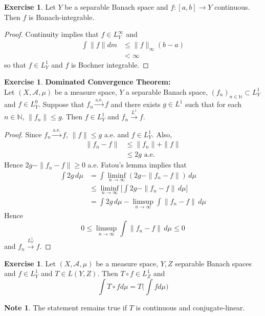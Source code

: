 \documentclass{book}
\theoremstyle{definition}
\newtheorem{note}[definition]{Note}
\newtheorem{ex}[definition]{Exercise}
\newcommand{\N}{\mathbb{N}}
\newcommand{\MA}{\mathcal{A}}
\newcommand{\lex}[1]{\label{ex:#1}}
\DeclareMathOperator*{\0}{\mbf{0}}
\DeclareMathOperator*{\1}{\mbf{1}}
\newcommand{\limfn}{\liminf \limits_{n \rightarrow \infty}}
\newcommand{\limpn}{\limsup \limits_{n \rightarrow \infty}}
\newcommand{\convt}[1]{\xrightarrow{\text{#1}}}
\newcommand{\conv}[1]{\xrightarrow{#1}}
\newcommand{\dmu}{\, d \mu}
\begin{document}
	
	\begin{ex} \lex{00000} 
	Let $Y$ be a separable Banach space and $f:[a,b] \rightarrow Y$ continuous. Then $f$ is Banach-integrable.
	\end{ex}
	
	\begin{proof}
	Continuity implies that $f \in L_Y^{\infty}$ and 
	\begin{align*}
	\int \| f \| dm 
	&\leq \| f\|_{\infty}(b-a) \\
	&< \infty
\end{align*}
	so that $f \in L^1_Y$ and $f$ is Bochner integrable.
\end{proof}			
	
	\begin{ex} \lex{00000} \textbf{Dominated Convergence Theorem:}\\  
		Let $(X, \MA, \mu)$ be a measure space, $Y$ a separable Banach space, $(f_n)_{n \in \N} \subset L^1_Y$ and $f \in L^0_Y$. Suppose that $f_n \convt{a.e.} f$ and there exists $g \in L^1$ such that for each $n \in \N$, $\|f_n\| \leq g$. Then $f \in L^1_Y$ and $f_n \conv{L^1} f$. 
	\end{ex}
	
	\begin{proof}
	Since $f_n \convt{a.e.} f$, $\|f\| \leq g$ a.e. and $f \in L^1_Y$. Also, 
	\begin{align*}
	\|f_n - f\| 
	&\leq \|f_n\| + \|f\| \\
	& \leq 2g \text{ a.e.}
	\end{align*}
	Hence $2g - \|f_n - f\| \geq 0$ a.e.
	Fatou's lemma implies that 
	\begin{align*}
	\int 2g \dmu 
	&= \int \limfn(2g - \|f_n - f\|) \dmu \\
	&\leq \limfn \bigg[ \int 2g - \|f_n - f\| \dmu \bigg] \\
	&= \int 2g \dmu - \limpn \int \|f_n - f\| \dmu
\end{align*}	 
	Hence $$0 \leq \limpn \int \|f_n - f\| \dmu \leq 0$$  and $f_n \conv{L^1_Y} f$.
	\end{proof}		
	
	\begin{ex} \lex{00000} 
	Let $(X, \MA, \mu)$ be a measure space, $Y,Z$ separable Banach spaces and $f \in L^1_Y$ and $T \in L(Y,Z)$. Then $T \circ f \in L^1_Z$ and $$\int T \circ f d \mu = T\bigg( \int f d\mu \bigg)$$
	\end{ex}
	
	\begin{note}
	The statement remains true if $T$ is continuous and conjugate-linear. 
	\end{note}
	
\end{document}
